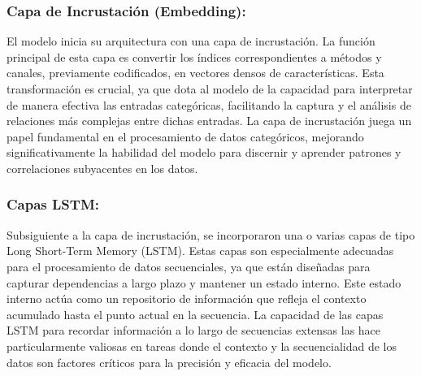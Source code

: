 \subsubsection{Capa de Incrustación (Embedding):} 
El modelo inicia su arquitectura con una capa de incrustación. La función principal de esta capa es convertir los índices correspondientes a métodos y canales, previamente codificados, en vectores densos de características. Esta transformación es crucial, ya que dota al modelo de la capacidad para interpretar de manera efectiva las entradas categóricas, facilitando la captura y el análisis de relaciones más complejas entre dichas entradas. La capa de incrustación juega un papel fundamental en el procesamiento de datos categóricos, mejorando significativamente la habilidad del modelo para discernir y aprender patrones y correlaciones subyacentes en los datos.

\subsubsection{Capas LSTM:} 
Subsiguiente a la capa de incrustación, se incorporaron una o varias capas de tipo Long Short-Term Memory (LSTM). Estas capas son especialmente adecuadas para el procesamiento de datos secuenciales, ya que están diseñadas para capturar dependencias a largo plazo y mantener un estado interno. Este estado interno actúa como un repositorio de información que refleja el contexto acumulado hasta el punto actual en la secuencia. La capacidad de las capas LSTM para recordar información a lo largo de secuencias extensas las hace particularmente valiosas en tareas donde el contexto y la secuencialidad de los datos son factores críticos para la precisión y eficacia del modelo.

